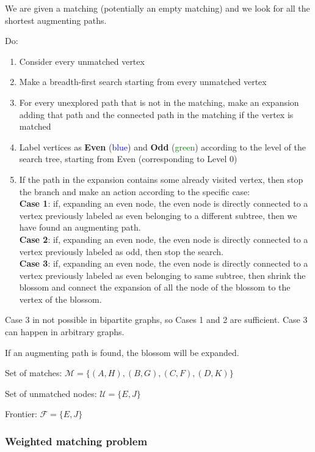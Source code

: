 \documentclass[10pt,a4paper]{article}
\begin{document}
We are given a matching (potentially an empty matching) and we look for all the shortest augmenting paths.
\begin{shaded}
Do:
\begin{enumerate}
\item Consider every unmatched vertex
\item Make a breadth-first search starting from every unmatched vertex
\item For every unexplored path that is not in the matching, make an expansion adding that path and the connected path in the matching if the vertex is matched
\item Label vertices as \textbf{Even} (\textcolor{blue}{blue}) and \textbf{Odd} (\textcolor{green}{green}) according to the level of the search tree, starting from Even (corresponding to Level 0)
\item If the path in the expansion contains some already visited vertex, then stop the branch and make an action according to the specific case:\\
\textbf{Case 1}: if, expanding an even node, the even node is directly connected to a vertex previously labeled as even belonging to a different subtree, then we have found an augmenting path.\\
\textbf{Case 2}: if, expanding an even node, the even node is directly connected to a vertex previously labeled as odd, then stop the search.\\
\textbf{Case 3}: if, expanding an even node, the even node is directly connected to a vertex previously labeled as even belonging to same subtree, then shrink the blossom and connect the expansion of all the node of the blossom to the vertex of the blossom.
\end{enumerate}
\end{shaded}
Case 3 in not possible in bipartite graphs, so Cases 1 and 2 are sufficient. Case 3 can happen in arbitrary graphs.

If an augmenting path is found, the blossom will be expanded.
\newline

Set of matches: $\mathscr{M} = \{(A,H), (B,G), (C, F), (D,K) \}$

Set of unmatched nodes: $\mathscr{U} = \{ E, J \}$

Frontier: $\mathscr{F} = \{ E, J \}$

\subsubsection{Weighted matching problem}\label{weighted-matching-problem}
\end{document}
